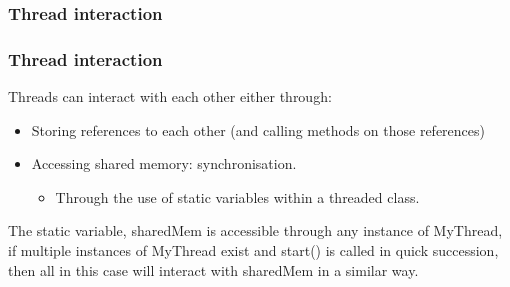 \documentclass{beamer}
\begin{document}
\subsubsection{Thread interaction}
\begin{frame}
\frametitle{Thread interaction}
Threads can interact with each other either through:
\begin{itemize}
\item Storing references to each other (and calling methods on those references)
\item Accessing shared memory: synchronisation.
\begin{itemize}
\item Through the use of static variables within a threaded class.
\end{itemize}
\end{itemize}
\sharedMemory
The static variable, sharedMem is accessible through any instance of MyThread,  if multiple instances of MyThread exist and start() is called in quick succession, then all in this case will interact with sharedMem in a similar way.
\end{frame}

\end{document}
